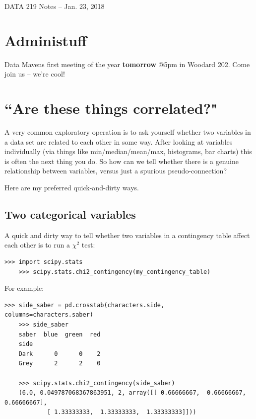 \documentclass[12pt]{article}
\begin{document}
\begin{center}
\begin{Large}
DATA 219 Notes -- Jan. 23, 2018
\end{Large}
\end{center}
\vspace{.3in}

\section{Administuff}

\begin{compactitem}
\item Data Mavens first meeting of the year \textbf{tomorrow} @5pm in Woodard
202. Come join us -- we're cool!
\end{compactitem}

\section{``Are these things correlated?"}

A very common exploratory operation is to ask yourself whether two variables
in a data set are related to each other in some way. After looking at
variables individually (via things like min/median/mean/max, histograms, bar
charts) this is often the next thing you do. So how can we tell whether there
is a genuine relationship between variables, versus just a spurious
pseudo-connection?

Here are my preferred quick-and-dirty ways.

\subsection{Two categorical variables}

A quick and dirty way to tell whether two variables in a contingency table
affect each other is to run a $\chi ^2$ test:

\begin{Verbatim}[fontsize=small,samepage=true,frame=none]
    >>> import scipy.stats
    >>> scipy.stats.chi2_contingency(my_contingency_table)
\end{Verbatim}

For example:

\begin{Verbatim}[fontsize=small,samepage=true,frame=none]
    >>> side_saber = pd.crosstab(characters.side, columns=characters.saber)
    >>> side_saber
    saber  blue  green  red
    side                   
    Dark      0      0    2
    Grey      2      2    0

    >>> scipy.stats.chi2_contingency(side_saber)
    (6.0, 0.049787068367863951, 2, array([[ 0.66666667,  0.66666667,  0.66666667],
            [ 1.33333333,  1.33333333,  1.33333333]]))
\end{Verbatim}
\end{document}
